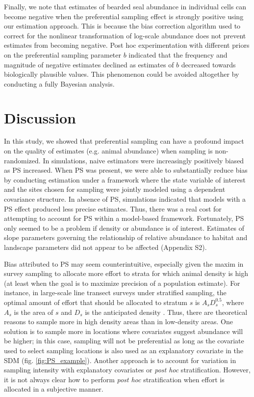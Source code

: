 \documentclass[times,mee,doublespace,]{besauth2}
\begin{document}
Finally, we note that estimates of bearded seal abundance in individual cells can become negative when the preferential sampling effect is strongly positive using our estimation approach.  This is because the bias correction algorithm \citep{TierneyEtAl1989,ThorsonKristensen2016} used to correct for the nonlinear transformation of log-scale abundance does not prevent estimates from becoming negative.  Post hoc experimentation with different priors on the preferential sampling parameter $b$ indicated that the frequency and magnitude of negative estimates declined as estimates of $b$ decreased towards biologically plausible values.  This phenomenon could be avoided altogether by conducting a fully Bayesian analysis.


\section{Discussion}


In this study, we showed that preferential sampling can have a profound impact on the quality of estimates (e.g. animal abundance) when sampling is non-randomized. In simulations, naive estimators were increasingly positively biased as PS increased. When PS was present, we were able to substantially reduce bias by conducting estimation under a framework where the state variable of interest and the sites chosen for sampling were jointly modeled using a dependent covariance structure.  In absence of PS, simulations indicated that models with a PS effect produced less precise estimates. Thus, there was a real cost for attempting to account for PS within a model-based framework.  Fortunately, PS only seemed to be a problem if density or abundance is of interest. Estimates of slope parameters governing the relationship of relative abundance to habitat and landscape parameters did not appear to be affected (Appendix S2).

Bias attributed to PS may seem counterintuitive, especially given the maxim in survey sampling to allocate more effort to strata for which animal density is high (at least when the goal is to maximize precision of a population estimate). For instance, in large-scale line transect surveys under stratified sampling, the optimal amount of effort that should be allocated to stratum $s$ is $A_s D_s^{0.5}$, where $A_s$ is the area of $s$ and $D_s$ is the anticipated density \citep[][eqn 7.7]{BucklandEtAl2001}.  Thus, there are theoretical reasons to sample more in high density areas than in low-density areas. One solution is to sample more in locations where covariates suggest abundance will be higher; in this case, sampling will not be preferential as long as the covariate used to select sampling locations is also used as an explanatory covariate in the SDM (fig. \ref{fig:PS_example}).  Another approach is to account for variation in sampling intensity with explanatory covariates or \textit{post hoc} stratification. However, it is not always clear how to perform \textit{post hoc} stratification when effort is allocated in a subjective manner.
\end{document}
